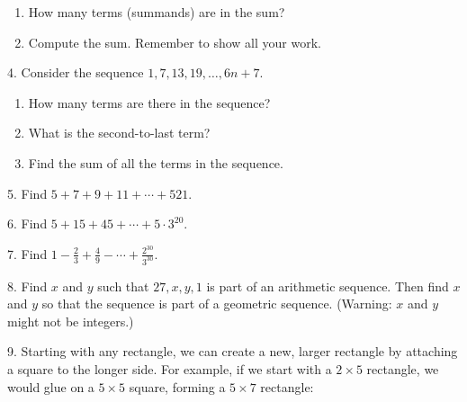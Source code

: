 \documentclass[10pt,]{book}
\theoremstyle{plain}
\theoremstyle{definition}
\numberwithin{equation}{chapter}
\begin{document}
\begin{exerciselist}
\leavevmode%
\begin{enumerate}[label=(\alph*)]
\item\hypertarget{li-522}{}
                  How many terms (summands) are in the sum?
\item\hypertarget{li-523}{}
                  Compute the sum. Remember to show all your work.
\end{enumerate}
\par\smallskip
\item[4.]\hypertarget{exercise-152}{}
              Consider the sequence \(1, 7, 13, 19, \ldots, 6n + 7\).
\leavevmode%
\begin{enumerate}[label=(\alph*)]
\item\hypertarget{li-526}{}
                  How many terms are there in the sequence?
\item\hypertarget{li-527}{}
                  What is the second-to-last term?
\item\hypertarget{li-528}{}
                  Find the sum of all the terms in the sequence.
\end{enumerate}
\par\smallskip
\item[5.]\hypertarget{exercise-153}{}
              Find \(5 + 7 + 9 + 11+ \cdots + 521\).
\par\smallskip
\item[6.]\hypertarget{exercise-154}{}
              Find \(5 + 15 + 45 + \cdots + 5\cdot 3^{20}\).
\par\smallskip
\item[7.]\hypertarget{exercise-155}{}
              Find \(1 - \frac{2}{3} + \frac{4}{9} - \cdots + \frac{2^{30}}{3^{30}}\).
\par\smallskip
\item[8.]\hypertarget{exercise-156}{}
              Find \(x\) and \(y\) such that \(27, x, y, 1\) is part of an arithmetic sequence. Then find \(x\) and \(y\) so that the sequence is part of a geometric sequence. (Warning: \(x\) and \(y\) might not be integers.)
\par\smallskip
\item[9.]\hypertarget{exercise-157}{}
                    Starting with any rectangle, we can create a new, larger rectangle by attaching a square to the longer side. For example, if we start with a \(2\times 5\) rectangle, we would glue on a \(5\times 5\) square, forming a \(5 \times 7\) rectangle:

\end{exerciselist}
\end{document}

